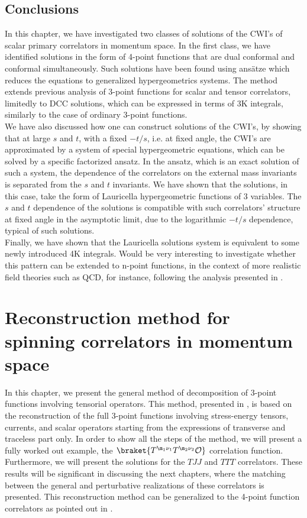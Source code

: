 \documentclass[a4paper,11pt,openright,twoside]{book}
\newcommand{\mO}{\mathcal{O}}
\let\n=\nu      \let\x=\xi     \let\p=\pi      \let\r=\rho
\numberwithin{equation}{section}
\begin{document}
{{	\section{Conclusions}
	In this chapter, we have investigated two classes of solutions of the CWI's of scalar primary correlators in momentum space. In the first class, we have identified solutions in the form of 4-point functions that are dual conformal and conformal simultaneously. Such solutions have been found using ans\"atze which reduces the equations to generalized hypergeometrics systems. The method extends previous analysis of 3-point functions for scalar and tensor correlators, limitedly to DCC solutions, which can be expressed in terms of 3K integrals, similarly to the case of ordinary 3-point functions. \\ 
	We have also discussed how one can construct solutions of the CWI's, by showing that at large $s$ and $t$, with a fixed $-t/s$, i.e. at fixed angle, the CWI's are approximated by a system of special hypergeometric equations, which can be solved by a specific factorized ansatz. In the ansatz, which is an exact solution of such a system, the dependence of the correlators on the external mass invariants is separated from the $s$ and $t$ invariants. We have shown that the solutions, in this case, take the form of Lauricella hypergeometric functions of 3 variables. The $s$ and $t$ dependence of the solutions is compatible with such correlators' structure at fixed angle in the asymptotic limit, due to the logarithmic $-t/s$ dependence, typical of such solutions.\\
	Finally, we have shown that the Lauricella solutions system is equivalent to some newly introduced 4K integrals. Would be very interesting to investigate whether this pattern can be extended to n-point functions, in the context of more realistic field theories such as QCD, for instance, following the analysis presented in \cite{Kidonakis:1998nf,Sterman:2002qn,Aybat:2006mz}.
\chapter{Reconstruction method for spinning correlators in momentum space}\label{tensstruc}
In this chapter, we present the general method of decomposition of $3$-point functions involving tensorial operators. This method, presented in \cite{ Bzowski:2014qja, Bzowski:2018fql,Bzowski:2017poo,Bzowski:2011ab}, is based on the reconstruction of the full $3$-point functions involving stress-energy tensors, currents, and scalar operators starting from the expressions of transverse and traceless part only. In order to show all the steps of the method, we will present a fully worked out example, the $\braket{T^{\m_1\n_1}T^{\m_2\n_2}\mO}$ correlation function. Furthermore, we will present the solutions for the $TJJ$ and $TTT$ correlators. These results will be significant in discussing the next chapters, where the matching between the general and perturbative realizations of these correlators is presented. 
This reconstruction method can be generalized to the 4-point function correlators as pointed out in \cite{Bzowski:2013sza,Coriano:2019nkw}. 

}}
\end{document}
